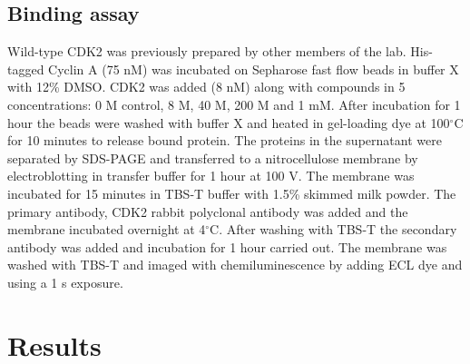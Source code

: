\subsection{Binding assay}

Wild-type CDK2 was previously prepared by other members of the lab.
His-tagged Cyclin A (75 nM) was incubated on Sepharose fast flow beads in buffer X with 12\% DMSO.
CDK2 was added (8 nM) along with compounds in 5 concentrations: 0 M control, 8 \textmu M, 40 \textmu M, 200 \textmu M and 1 mM.
After incubation for 1 hour the beads were washed with buffer X and heated in gel-loading dye at 100$^{\circ}$C for 10 minutes to release bound protein.
The proteins in the supernatant were separated by SDS-PAGE and transferred to a nitrocellulose membrane by electroblotting in transfer buffer for 1 hour at 100 V.
The membrane was incubated for 15 minutes in TBS-T buffer with 1.5\% skimmed milk powder.
The primary antibody, CDK2 rabbit polyclonal antibody was added and the membrane incubated overnight at 4$^{\circ}$C.
After washing with TBS-T the secondary antibody was added and incubation for 1 hour carried out.
The membrane was washed with TBS-T and imaged with chemiluminescence by adding ECL dye and using a 1 s exposure.


\section{Results}
\label{sec:cdk2_results}

